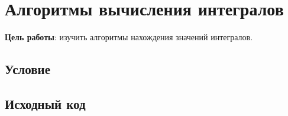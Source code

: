 
\usepackage{minted}





\section{Алгоритмы вычисления интегралов}

\textbf{Цель работы}: изучить алгоритмы нахождения значений интегралов.

\subsection{Условие}



\subsection{Исходный код}
\inputminted[fontsize=\footnotesize]{c}{../task.c}


